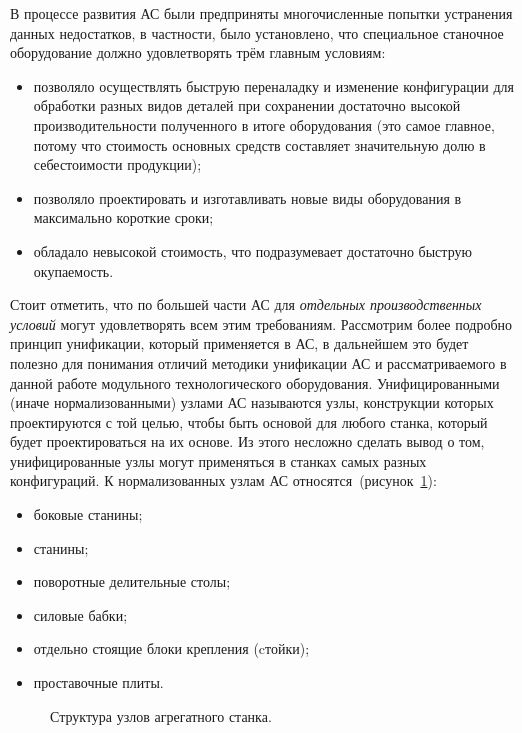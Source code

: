 В процессе развития АС были предприняты многочисленные попытки устранения данных недостатков, в частности, было установлено, что специальное станочное оборудование должно удовлетворять трём главным условиям:

\begin{itemize}
	\item позволяло осуществлять быструю переналадку и изменение конфигурации для обработки разных видов деталей при сохранении достаточно высокой производительности полученного в итоге оборудования (это самое главное, потому что стоимость основных средств составляет значительную долю в себестоимости продукции);
	\item позволяло проектировать и изготавливать новые виды оборудования в максимально короткие сроки;
	\item обладало невысокой стоимость, что подразумевает достаточно быструю окупаемость.
\end{itemize}


Стоит отметить, что по большей части АС для \textit{отдельных производственных условий} могут удовлетворять всем этим требованиям. Рассмотрим более подробно принцип унификации, который применяется в АС, в дальнейшем это будет полезно для понимания отличий методики унификации АС и рассматриваемого в данной работе модульного технологического оборудования. Унифицированными (иначе нормализованными) узлами АС называются узлы, конструкции которых проектируются с той целью, чтобы быть основой для любого станка, который будет проектироваться на их основе. Из этого несложно сделать вывод о том, унифицированные узлы могут применяться в станках самых разных конфигураций. К нормализованных узлам АС относятся~(рисунок~\cref{fig:agr-machine}):

\begin{itemize}
	\item боковые станины;
	\item станины;
	\item поворотные делительные столы;
	\item силовые бабки;
	\item отдельно стоящие блоки крепления (cтойки); 
	\item проставочные плиты.
\end{itemize}

\begin{figure}[ht]
	\caption{Структура узлов агрегатного станка.}\label{fig:agr-machine}
\end{figure}

